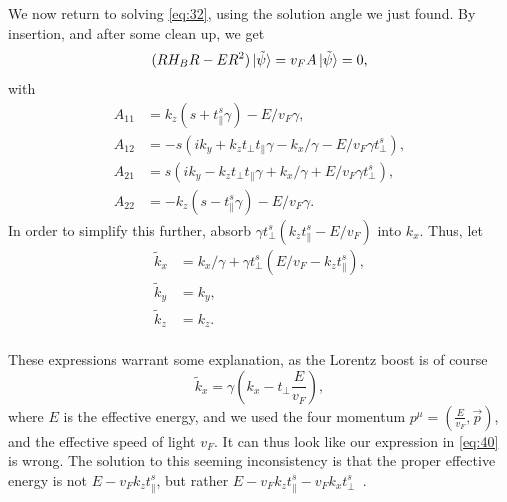 We now return to solving \cref{eq:32}, using the solution angle we just found.
By insertion, and after some clean up, we get
\begin{equation}
  \label{eq:39}
  (R H_{B} R - E R^2 ) \ket{\tilde{\psi}}
  = v_F  A \ket{\tilde{\psi}} = 0,
\end{equation}
with
\begin{align*}
  A_{11} &=   k_z ( s + t_{\parallel}^s \gamma ) - E / v_F \gamma,\\
  A_{12} &=  -s ( ik_y + k_z t_\perp t_\parallel \gamma - k_x / \gamma - E /v_{F} \gamma t_{\perp}^s),\\
  A_{21} &= s ( i k_y - k_z t_\perp t_\parallel \gamma + k_x / \gamma + E /v_F \gamma t_{\perp}^s),\\
  A_{22} &= - k_z (s - t_{\parallel}^s \gamma) - E /v_F \gamma.
\end{align*}
In order to simplify this further, absorb \(\gamma t_{\perp}^s (k_{z} t_{\parallel}^s - E /v_{F}) \) into \(k_{x}\).
Thus, let
\begin{equation}
  \label{eq:40}
  \begin{split}
    \tilde{k}_{x} &= k_{x} / \gamma + \gamma t_{\perp}^s ( E /v_F - k_{z} t_{\parallel}^s),\\
    \tilde{k}_{y} &=  k_{y},\\
    \tilde{k}_{z} &=  k_{z}.\\
  \end{split}
\end{equation}

These expressions warrant some explanation, as the Lorentz boost is of course
\begin{equation}
  \label{eq:41}
  \tilde{k}_x = \gamma (k_x - t_{\perp} \frac{E}{v_{F}}),
\end{equation}
where \( E \) is the effective energy, and we used the four momentum \( p^{\mu } = (\frac{E}{v_{F}}, \vec{p}) \), and the effective speed of light \( v_F \).
It can thus look like our expression in \cref{eq:40} is wrong.
The solution to this seeming inconsistency is that the proper effective energy is not \( E - v_F k_z t^{s}_{\parallel} \), but rather \( E  - v_F k_z t^{s}_{\parallel} - v_F k_x t^{s}_{\perp}\)~\cite{yuPredictedUnusualMagnetoresponse2016}.

